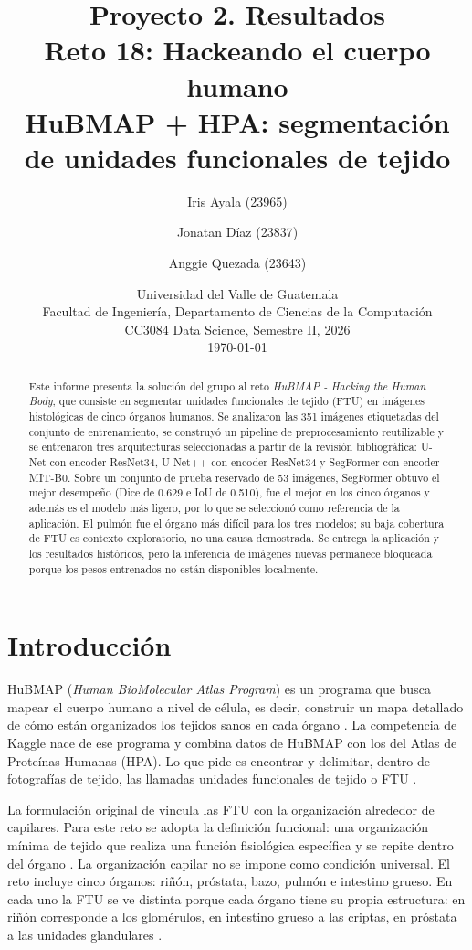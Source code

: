 \documentclass[11pt,letterpaper]{article}
\title{\vspace{-1.5cm}\textbf{Proyecto 2. Resultados}\\[0.3em]
\large Reto 18: Hackeando el cuerpo humano\\
\normalsize HuBMAP + HPA: segmentación de unidades funcionales de tejido}
\author{Iris Ayala (23965) \and Jonatan Díaz (23837) \and Anggie Quezada (23643)}
\date{Universidad del Valle de Guatemala\\
Facultad de Ingeniería, Departamento de Ciencias de la Computación\\
CC3084 Data Science, Semestre II, 2026\\[0.5em]
\today}
\begin{document}
\maketitle

\begin{abstract}
\noindent
Este informe presenta la solución del grupo al reto \emph{HuBMAP - Hacking the Human Body}, que
consiste en segmentar unidades funcionales de tejido (FTU) en imágenes histológicas de cinco órganos
humanos. Se analizaron las 351 imágenes etiquetadas del conjunto de entrenamiento, se construyó un
pipeline de preprocesamiento reutilizable y se entrenaron tres arquitecturas seleccionadas a partir
de la revisión bibliográfica: U-Net con encoder ResNet34, U-Net++ con encoder ResNet34 y SegFormer
con encoder MIT-B0. Sobre un conjunto de prueba reservado de 53 imágenes, SegFormer obtuvo el mejor
desempeño (Dice de 0.629 e IoU de 0.510), fue el mejor en los cinco órganos y además es el modelo
más ligero, por lo que se seleccionó como referencia de la aplicación. El pulmón fue el órgano más
difícil para los tres modelos; su baja cobertura de FTU es contexto exploratorio, no una causa
demostrada. Se entrega la aplicación y los resultados históricos, pero la inferencia de imágenes
nuevas permanece bloqueada porque los pesos entrenados no están disponibles localmente.
\end{abstract}

\tableofcontents
\newpage

\section{Introducción}

HuBMAP (\emph{Human BioMolecular Atlas Program}) es un programa que busca mapear el cuerpo humano a
nivel de célula, es decir, construir un mapa detallado de cómo están organizados los tejidos sanos
en cada órgano \parencite{hubmap2019}. La competencia de Kaggle nace de ese programa y combina datos
de HuBMAP con los del Atlas de Proteínas Humanas (HPA). Lo que pide es encontrar y delimitar, dentro
de fotografías de tejido, las llamadas unidades funcionales de tejido o FTU
\parencite{jain2023hacking}.

La formulación original de \textcite{debono2013ftu} vincula las FTU con la organización alrededor de
capilares. Para este reto se adopta la definición funcional: una organización mínima de tejido que
realiza una función fisiológica específica y se repite dentro del órgano \parencite{jain2023hacking}.
La organización capilar no se impone como condición universal. El reto
incluye cinco órganos: riñón, próstata, bazo, pulmón e intestino grueso. En cada uno la FTU se ve
distinta porque cada órgano tiene su propia estructura: en riñón corresponde a los glomérulos, en
intestino grueso a las criptas, en próstata a las unidades glandulares \parencite{bidanta2025ftu}.
\end{document}
